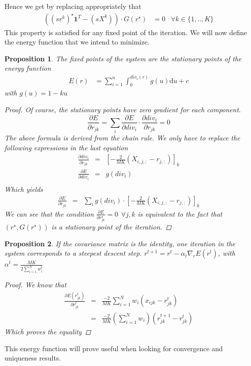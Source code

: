 \documentclass[12pt,a4paper]{article}
\newtheorem{proposition}{Proposition}
\begin{document}
Hence we get by replacing appropriately that
\begin{align*}
((sr^k)^{\star} \mathbf{1}^T - (sX^k))\cdot G(r^{\star}) &= 0 & \forall k\in \{1,..,K\}
\end{align*}
This property is satisfied for any fixed point of the iteration. We will now define the energy function that we intend to minimize.
\begin{proposition}
The fixed points of the system are the stationary points of the energy function
\begin{align}
E(r) &=  \sum_{i=1}^n \int_0^{div_i(r)}g(u) \mathrm{d}u + c \label{eq:energy}
\end{align}
with $g(u) = 1 -ku$
\begin{proof}
Of course, the stationary points have zero gradient for each component.
$$
\frac{\partial E}{\partial r_{jk}} =  \sum_{i}\frac{\partial E}{\partial div_i} \cdot \frac{\partial div_i}{\partial r_{jk}} = 0
$$
The above formula is derived from the chain rule. We only have to replace the following expressions in the last equation
\begin{eqnarray*}
\frac{\partial div_i}{\partial r_{jk}} & = & \left[-\frac{2}{MK} (X_{i,j,:}-r_{j,:})\right]_{k} \\
\frac{\partial E}{\partial div_i} & = & g(div_i)\\
\end{eqnarray*}
Which yields
\begin{eqnarray*}
\frac{\partial E}{\partial r_{jk}} & = & \sum_{i}g(div_i) \cdot \left[-\frac{2}{MK} (X_{i,j,:}-r_{j,:})\right]_{k} 
\end{eqnarray*}
We can see that the condition $\frac{\partial E}{\partial r^{\star}_{jk}}=0 \:\: \forall j,k$ is equivalent to the fact that $(r^{\star},G(r^{\star}))$ is a stationary point of the iteration.
\end{proof}
\end{proposition}
\begin{proposition}
If the covariance matrix is the identity, one iteration in the system corresponds to a steepest descent step.
$r^{t+1} = r^t - \alpha_t \nabla_r E(r^t)$, with $\alpha^t = \frac{MK}{2 \sum_{i=1}^N w^t_i}$
\begin{proof}
We know that 
\begin{eqnarray*}
\frac{\partial E(r^t_{jk})}{\partial r^t_{jk}} & = & \frac{-2}{MK} \sum_{i=1}^N w_i (x_{ijk}-r^t_{jk})\\
& = & \frac{-2}{MK} (\sum_{i=1}^N w_i)(r^{t+1}_{jk}- r^t_{jk})
\end{eqnarray*}
Which proves the equality
\end{proof}
\end{proposition}
This energy function will prove useful when looking for convergence and uniqueness results.
\end{document}
